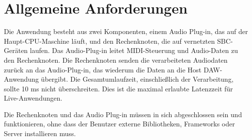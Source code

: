 \section{Allgemeine Anforderungen}

Die Anwendung besteht aus zwei Komponenten, einem Audio Plug-in, das auf der Haupt-CPU-Maschine läuft, und den Rechenknoten, die auf vernetzten SBC-Geräten laufen. Das Audio-Plug-in leitet MIDI-Steuerung und Audio-Daten zu den Rechenknoten. Die Rechenknoten senden die verarbeiteten Audiodaten zurück an das Audio-Plug-in, das wiederum die Daten an die Host DAW-Anwendung übergibt. Die Gesamtumlaufzeit, einschließlich der Verarbeitung, sollte 10 ms nicht überschreiten. Dies ist die maximal erlaubte Latenzzeit für Live-Anwendungen.

Die Rechenknoten und das Audio Plug-in müssen in sich abgeschlossen sein und funktionieren, ohne dass der Benutzer externe Bibliotheken, Frameworks oder Server installieren muss.